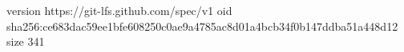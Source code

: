 version https://git-lfs.github.com/spec/v1
oid sha256:ce683dac59ee1bfe608250c0ae9a4785ac8d01a4bcb34f0b147ddba51a448d12
size 341
